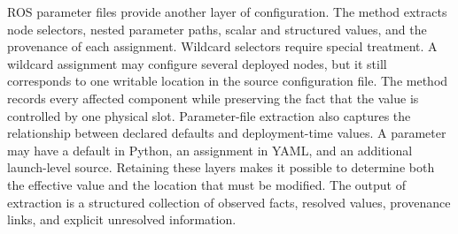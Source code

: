 ROS parameter files provide another layer of configuration. The method extracts node selectors, nested parameter paths, scalar and structured values, and the provenance of each assignment. Wildcard selectors require special treatment. A wildcard assignment may configure several deployed nodes, but it still corresponds to one writable location in the source configuration file. The method records every affected component while preserving the fact that the value is controlled by one physical slot.
Parameter-file extraction also captures the relationship between declared defaults and deployment-time values. A parameter may have a default in Python, an assignment in YAML, and an additional launch-level source. Retaining these layers makes it possible to determine both the effective value and the location that must be modified. The output of extraction is a structured collection of observed facts, resolved values, provenance links, and explicit unresolved information.

